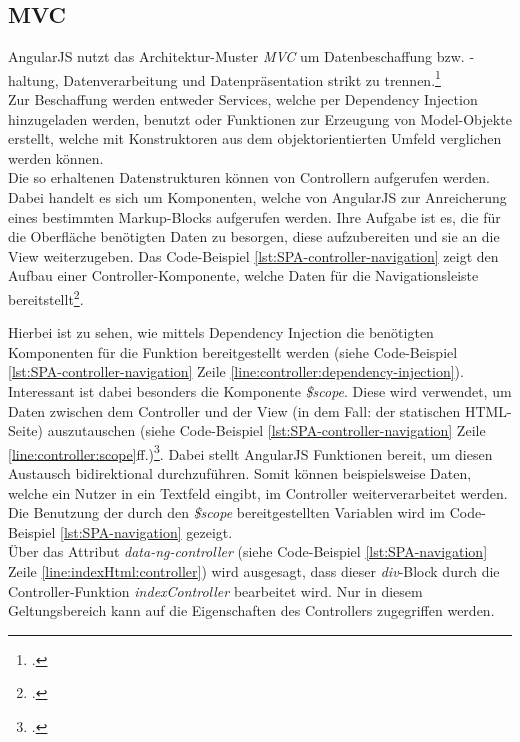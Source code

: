 \subsection{MVC}
\label{ssec:SPA-MVC}
AngularJS nutzt das Architektur-Muster \textit{\ac{MVC}} um Datenbeschaffung bzw. -haltung, Datenverarbeitung und Datenpräsentation strikt zu trennen.\footcite[S.34]{book:AngularJs:Steyer2015} \\ 
Zur Beschaffung werden entweder Services, welche per Dependency Injection hinzugeladen werden, benutzt oder Funktionen zur Erzeugung von Model-Objekte erstellt, welche mit Konstruktoren aus dem objektorientierten Umfeld verglichen werden können. \\
Die so erhaltenen Datenstrukturen können von Controllern aufgerufen werden. Dabei handelt es sich um Komponenten, welche von AngularJS zur Anreicherung eines bestimmten \gls{Markup}-Blocks aufgerufen werden. Ihre Aufgabe ist es, die für die Oberfläche benötigten Daten zu besorgen, diese aufzubereiten und sie an die View weiterzugeben. Das Code-Beispiel \ref{lst:SPA-controller-navigation} zeigt den Aufbau einer Controller-Komponente, welche Daten für die Navigationsleiste bereitstellt\footcite{online:angular:controller}.

Hierbei ist zu sehen, wie mittels Dependency Injection die benötigten Komponenten für die Funktion bereitgestellt werden (siehe Code-Beispiel \ref{lst:SPA-controller-navigation}  Zeile \ref{line:controller:dependency-injection}). Interessant ist dabei besonders die Komponente \textit{\$scope}. Diese wird verwendet, um Daten zwischen dem Controller und der View (in dem Fall: der statischen HTML-Seite) auszutauschen (siehe Code-Beispiel \ref{lst:SPA-controller-navigation} Zeile \ref{line:controller:scope}ff.)\footcite{online:angular:scopes}. Dabei stellt AngularJS Funktionen bereit, um diesen Austausch bidirektional durchzuführen. Somit können beispielsweise Daten, welche ein Nutzer in ein Textfeld eingibt, im Controller weiterverarbeitet werden.\\
Die Benutzung der durch den \textit{\$scope} bereitgestellten Variablen wird im Code-Beispiel \ref{lst:SPA-navigation} gezeigt.\\

Über das Attribut \textit{data-ng-controller} (siehe Code-Beispiel \ref{lst:SPA-navigation} Zeile \ref{line:indexHtml:controller}) wird ausgesagt, dass dieser \textit{div}-Block durch die Controller-Funktion \textit{indexController} bearbeitet wird. Nur in diesem Geltungsbereich kann auf die Eigenschaften des Controllers zugegriffen werden. \\
